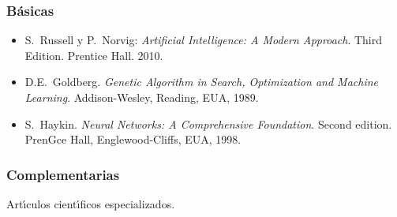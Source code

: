 \documentclass[10 pt]{article}
\begin{document}
\subsubsection{B\'{a}sicas}

 \begin{itemize}[itemsep=0em]

\item{S.\ Russell y P.\ Norvig: {\em Artificial Intelligence: A Modern Approach}. Third Edition. Prentice Hall. 2010.}
\item{D.E.\ Goldberg. {\em Genetic Algorithm in Search, Optimization and Machine Learning}. Addison-Wesley, Reading, EUA, 1989.}
\item{S.\ Haykin. {\em Neural Networks: A Comprehensive Foundation}. Second edition. PrenGce Hall, Englewood-Cliffs, EUA, 1998.}
\end{itemize}

\subsubsection{Complementarias}

Art\'{\i}culos cient\'{\i}ficos especializados.

\label{final} %


\end{document}
